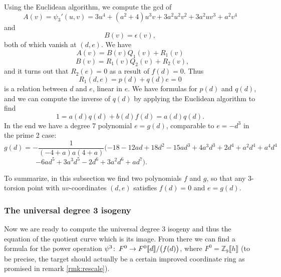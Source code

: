 \documentclass{gtpart}
\theoremstyle{definition}
\theoremstyle{remark}
\def\co{\colon\thinspace}
\newcommand{\mb}[1]{\mathbb{#1}}
\begin{document}
Using the Euclidean algorithm, we compute the gcd of 
\[
 A(v) = \psi_3'(u,v) = 3u^4 + (a^2 + 4) u^3 v + 3a^2 u^2 v^2 + 3a^2 u v^3 + 
 a^2 v^4 
\]
and 
\[
 B(v) = \epsilon(v), 
\]
both of which vanish at $(d,e)$.  We have 
\[
 A(v) = B(v)Q_1(v) + R_1(v) 
\]
\[
 ~~~B(v) = R_1(v)Q_2(v) + R_2(v), 
\]
and it turns out that $R_2(e) = 0$ as a result of $f(d) = 0$.  Thus 
\[
 R_1(d,e) = p(d) + q(d) e = 0 
\]
is a relation between $d$ and $e$, linear in $e$.  We have formulas for $p(d)$ 
and $q(d)$, and we can compute the inverse of $q(d)$ by applying the Euclidean 
algorithm to find 
\[
 1 = a(d)q(d) + b(d)f(d) = a(d)q(d).  
\]
In the end we have a degree 7 polynomial $e = g(d)$, comparable to $e = -d^3$ 
in the prime 2 case: 
\[
 g(d) = -\frac{1}{(-4 + a) a (4 + a)} (-18 - 12 a d + 18 d^2 - 15 a d^3 + 
 4 a^3 d^3 + 2 d^4 + a^2 d^4 + a^4 d^4 
\]
\[
 - 6 a d^5 + 3 a^3 d^5 - 2 d^6 + 3 a^2 d^6 + a d^7).  
 ~~~~~~~~~~~~~~~~~~~~~~~~~~~~~~~~~~~~~~~~~~~~~~~~~~ 
\]

To summarize, in this subsection we find two polynomials $f$ and $g$, so that 
any 3-torsion point with $uv$-coordinates $(d,e)$ satisfies $f(d) = 0$ and 
$e = g(d)$.  


\subsubsection{The universal degree 3 isogeny}

Now we are ready to compute the universal degree 3 isogeny and thus the 
equation of the quotient curve which is its image. From there we can find a 
formula for the power operation 
$\psi^3\co F^0  \to F^0 \llbracket d \rrbracket / \big(f(d)\big)$, where 
$F^0 = {\mb Z}_9 \llbracket h \rrbracket$ (to be precise, the target should 
actually be a certain improved coordinate ring as promised in remark 
\ref{rmk:rescale}).  
\end{document}
